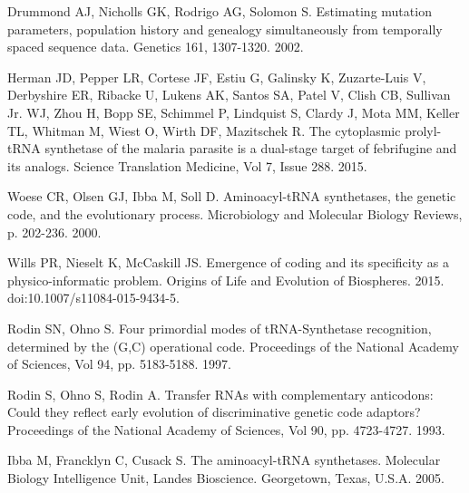 \documentclass[10pt,letterpaper]{article}
\begin{document}
\begin{thebibliography}{10}
Drummond AJ, Nicholls GK, Rodrigo AG, Solomon S. 
\newblock Estimating mutation parameters, population history and genealogy simultaneously from temporally spaced sequence data.
\newblock Genetics 161, 1307-1320. 2002.

Herman JD, Pepper LR, Cortese JF, Estiu G, Galinsky K, Zuzarte-Luis V, Derbyshire ER, Ribacke U, Lukens AK, Santos SA, Patel V, Clish CB, Sullivan Jr. WJ, Zhou H,
Bopp SE, Schimmel P, Lindquist S, Clardy J, Mota MM, Keller TL, Whitman M, Wiest O, Wirth DF, Mazitschek R. 
\newblock The cytoplasmic prolyl-tRNA synthetase of the malaria parasite is a dual-stage target of febrifugine and its analogs.
\newblock Science Translation Medicine, Vol 7, Issue 288. 2015.

Woese CR, Olsen GJ, Ibba M, Soll D.
\newblock Aminoacyl-tRNA synthetases, the genetic code, and the evolutionary process.
\newblock Microbiology and Molecular Biology Reviews, p. 202-236. 2000.

Wills PR, Nieselt K, McCaskill JS.
\newblock Emergence of coding and its specificity as a physico-informatic problem.
\newblock Origins of Life and Evolution of Biospheres. 2015. doi:10.1007/s11084-015-9434-5.

Rodin SN, Ohno S.
\newblock Four primordial modes of tRNA-Synthetase recognition, determined by the (G,C) operational code.
\newblock Proceedings of the National Academy of Sciences, Vol 94, pp. 5183-5188. 1997.

Rodin S, Ohno S, Rodin A.
\newblock Transfer RNAs with complementary anticodons: Could they reflect early evolution of discriminative genetic code adaptors?
\newblock Proceedings of the National Academy of Sciences, Vol 90, pp. 4723-4727. 1993.

Ibba M, Francklyn C, Cusack S.
\newblock The aminoacyl-tRNA synthetases.
\newblock Molecular Biology Intelligence Unit, Landes Bioscience. Georgetown, Texas, U.S.A. 2005.

\end{thebibliography}
\end{document}
